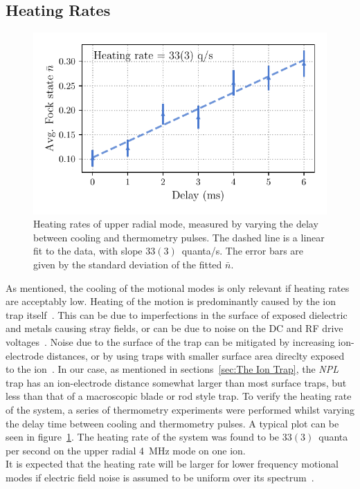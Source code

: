 \subsection{Heating Rates}
\label{sec:Heating}

    \begin{figure}
        \begin{center}
        \noindent\includegraphics[width=0.75\linewidth]{
            figures/pdf_figure/heating_rate.pdf
            }
        \end{center}
        \caption{
            Heating rates of upper radial mode, measured by varying the delay between cooling and thermometry pulses. The dashed line is a linear fit to the data, with slope $33(3)$~quanta/s. The error bars are given by the standard deviation of the fitted $\bar{n}$.
            }
        \label{fig:heating rates}
    \end{figure}

    As mentioned, the cooling of the motional modes is only relevant if heating rates are acceptably low. Heating of the motion is predominantly caused by the ion trap
    itself~\cite{}. This can be due to imperfections in the surface of exposed
    dielectric and metals causing stray fields, or can be due to noise on the DC
    and RF drive voltages~\cite{}. Noise due to the surface of the trap can be
    mitigated by increasing ion-electrode distances, or by using traps with
    smaller surface area direclty exposed to the ion~\cite{}. In our case, as mentioned
    in sections~\ref{sec:The Ion Trap}, the \emph{NPL} trap has an ion-electrode 
    distance somewhat larger than most surface traps, but less than that of a
    macroscopic blade or rod style trap. To verify the heating rate of the
    system, a series of thermometry experiments were performed whilst varying the delay
    time between cooling and thermometry pulses. A typical plot can be seen in
    figure~\ref{fig:heating rates}. The heating rate of the system
    was found to be $33(3)$~quanta per second on the upper radial 4~MHz mode on
    one ion.\\
    It is expected that the heating rate will be larger for lower frequency
    motional modes if electric field noise is assumed to be uniform over its spectrum~\cite{}. 
    
